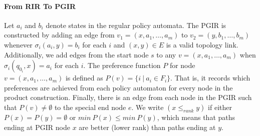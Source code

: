 \documentclass[10pt]{sigalternate052015}
\newcommand{\para}[1]{\paragraph*{\textbf{#1}}}
\newcommand{\set}[1]{\ensuremath{\{ #1 \} }}
\begin{document}
\para{From RIR To PGIR}

Let $a_i$ and $b_i$ denote states in the regular policy automata.
The PGIR is constructed by adding an edge from $v_1 = (x, a_1, \dots, a_m)$ to $v_2 = (y, b_1, \dots, b_m)$ whenever $\sigma_i(a_i, y) = b_i$ for each $i$ and $(x,y) \in E$ is a valid topology link.
%
Additionally, we add edges from the start node $s$ to any $v = (x, a_1, \dots, a_m)$ when $\sigma_i(q_{0_i}, x) = a_i$ for each $i$.
%
The preference function $P$ for node $v = (x, a_1, \dots, a_m)$ is defined as $P(v) = \set{i~\vert~a_i \in F_i} $. That is, it records which preferences are achieved from each policy automaton for every node in the product construction.
%
Finally, there is an edge from each node in the PGIR such that $P(v) \neq \emptyset$ to the special end node $e$. We write $(x \leq_{rank} y)$ if either $P(x) = P(y) = \emptyset$ or $min ~ P(x) \leq min ~ P(y)$, which means that paths ending at PGIR node $x$ are better (lower rank) than paths ending at $y$.
\end{document}
